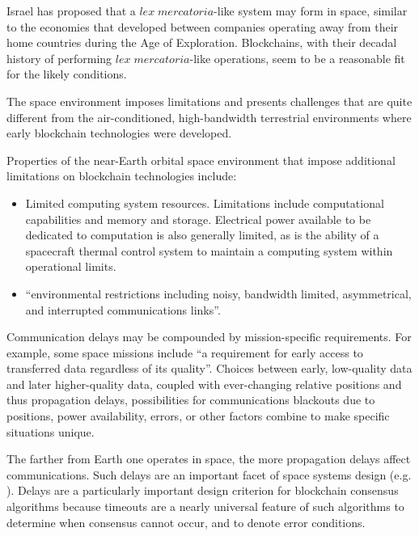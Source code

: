 \documentclass[]{aiaa-tc}%
\begin{document}
Israel has proposed that a $\mathit{lex\; mercatoria}$-like system may form in space, similar to the economies that developed between companies operating away from their home countries during the Age of Exploration\cite{israel_space_2019}. Blockchains, with their decadal history of performing $\mathit{lex\; mercatoria}$-like operations, seem to be a reasonable fit for the likely conditions.

The space environment imposes limitations and presents challenges that are quite different from the air-conditioned, high-bandwidth terrestrial environments where early blockchain technologies were developed.

Properties of the near-Earth orbital space environment that impose additional limitations on blockchain technologies include:
\begin{itemize}
\item Limited computing system resources. Limitations include computational capabilities and memory\cite{CCSDS_2007} and storage\cite{yu_blockchain_2019}. Electrical power available to be dedicated to computation is also generally limited, as is the ability of a spacecraft thermal control system to maintain a computing system within operational limits.
\item ``environmental restrictions including noisy, bandwidth limited, asymmetrical, and interrupted communications links''\cite{CCSDS_2007}.
\end{itemize}

Communication delays may be compounded by mission-specific requirements. For example, some space missions include ``a requirement for early access to transferred data regardless of its quality''\cite{CCSDS_2007}. Choices between early, low-quality data and later higher-quality data, coupled with ever-changing relative positions and thus propagation delays, possibilities for communications blackouts due to positions, power availability, errors, or other factors combine to make specific situations unique.

The farther from Earth one operates in space, the more propagation delays affect communications. Such delays are an important facet of space systems design (e.g. \cite{CCSDS_2007,yu_blockchain_2019}). Delays are a particularly important design criterion for blockchain consensus algorithms because timeouts are a nearly universal feature of such algorithms to determine when consensus cannot occur, and to denote error conditions.
\end{document}
